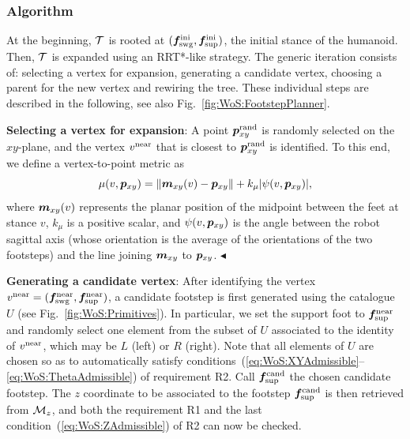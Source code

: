 \medskip

\subsubsection{Algorithm}
\label{sec:WoS:offlineCase:FP:PlannerOverview}

At the beginning, $\cal T$ is rooted at $({\bm{f}}_{\rm swg}^{\rm ini}, {\bm{f}}_{\rm sup}^{\rm ini})$, the initial stance of the humanoid.
Then, $\cal T$ is expanded using an RRT*-like strategy. The generic iteration consists of: selecting a vertex for expansion, generating a candidate vertex, choosing a parent for the new vertex and rewiring the tree. These individual steps are described in the following, see also Fig.~\ref{fig:WoS:FootstepPlanner}.

{\bf Selecting a vertex for expansion}: A point ${\bm{p}}_{xy}^{\rm rand}$ is randomly selected on the $xy$-plane, and
the vertex $v^{\rm near}$ that is closest to ${\bm{p}}_{xy}^{\rm rand}$ is identified. To this end, we define a vertex-to-point metric as
\begin{equation*}
\mu(v, {\bm{p}}_{xy}) = \lVert {\bm{m}}_{xy}(v) - {\bm{p}}_{xy} \rVert + k_{\mu} |\psi(v,{\bm{p}}_{xy})|,
\end{equation*}
where ${\bm{m}}_{xy}(v)$ represents the planar position of the midpoint between the feet at stance $v$, $k_{\mu}$ is a positive scalar, and $\psi(v,{\bm{p}}_{xy})$ is the angle between the robot sagittal axis (whose orientation is the average of the orientations of the two footsteps) and the line joining ${\bm{m}}_{xy}$ to ${\bm{p}}_{xy}$. 
\hfill $\blacktriangleleft$

{\bf Generating a candidate vertex}:  
After identifying the vertex $v^{\rm near}=({\bm{f}}_{\rm swg}^{\rm near},{\bm{f}}_{\rm sup}^{\rm near})$, a candidate footstep is first generated using the catalogue $U$ (see Fig.~\ref{fig:WoS:Primitives}). In particular, we set the support foot to ${\bm{f}}_{\rm sup}^{\rm near}$ and randomly select one element from the subset of $U$ associated to the identity of $v^{\rm near}$, which may be $L$ (left) or $R$ (right). Note that all elements of $U$ are chosen so as to automatically satisfy conditions~(\ref{eq:WoS:XYAdmissible}--\ref{eq:WoS:ThetaAdmissible}) of requirement R2.
Call ${\bm{f}}_{\rm sup}^{\rm cand}$ the chosen candidate footstep. The $z$ coordinate to be associated to the footstep ${\bm{f}}_{\rm sup}^{\rm cand}$ is then retrieved from ${\cal M}_{z}$, and both the requirement R1 and the last condition~(\ref{eq:WoS:ZAdmissible}) of R2 can now be checked.

